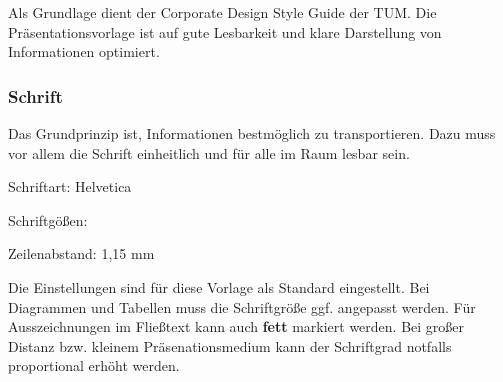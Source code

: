
\begin{frame}

Als Grundlage dient der Corporate Design Style Guide der TUM.\newline
Die Präsentationsvorlage ist auf gute Lesbarkeit und klare Darstellung von
Informationen optimiert.

\end{frame}
\clearpage


\begin{frame}
    \frametitle{Schrift}

Das Grundprinzip ist, Informationen bestmöglich zu transportieren. Dazu muss
vor allem die Schrift einheitlich und für alle im Raum lesbar sein.

Schriftart: Helvetica

Schriftgößen: \PraesentationBeispieleSchriftgroessen

Zeilenabstand: 1,15 mm

Die Einstellungen sind für diese Vorlage als Standard eingestellt. Bei
Diagrammen und Tabellen muss die Schriftgröße ggf. angepasst werden. Für
Ausszeichnungen im Fließtext kann auch \textbf{fett} markiert werden. Bei
großer Distanz bzw. kleinem Präsenationsmedium kann der Schriftgrad notfalls
proportional erhöht werden.

\end{frame}
\clearpage


